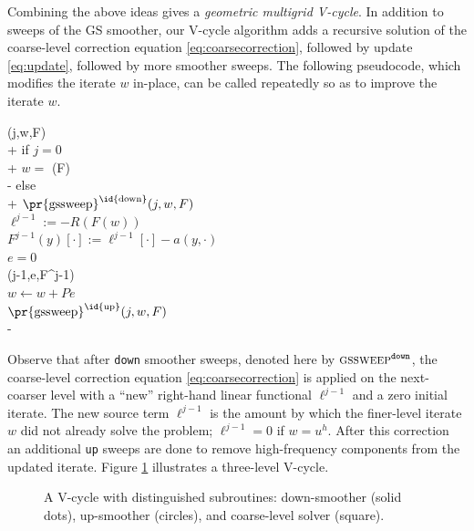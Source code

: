 \documentclass[letterpaper,final,12pt,reqno]{amsart}
\theoremstyle{claim}
\numberwithin{equation}{section}
\numberwithin{figure}{section}
\numberwithin{table}{section}
\begin{document}
Combining the above ideas gives a \emph{geometric multigrid V-cycle}.  In addition to sweeps of the GS smoother, our V-cycle algorithm adds a recursive solution of the coarse-level correction equation \eqref{eq:coarsecorrection}, followed by update \eqref{eq:update}, followed by more smoother sweeps.  The following pseudocode, which modifies the iterate $w$ in-place, can be called repeatedly so as to improve the iterate $w$.
\begin{pseudo*}
(j,w,F)\text{:} \\+
    if $j=0$ \\+
        $w =$ (F) \\-
    else \\+
        $\text{\pr{gssweep}}^{\text{\id{down}}}(j,w,F)$ \\
        $\ell^{j-1} := -R(F(w))$ \\
        $F^{j-1}(y)[\cdot] := \ell^{j-1}[\cdot] - a(y,\cdot)$ \\
        $e=0$ \\
        (j-1,e,F^{j-1}) \\
        $w \gets w + P e$ \\
        $\text{\pr{gssweep}}^{\text{\id{up}}}(j,w,F)$ \\-
\end{pseudo*}

Observe that after \texttt{down} smoother sweeps, denoted here by $\text{\textsc{gssweep}}^{\text{\texttt{down}}}$, the coarse-level correction equation \eqref{eq:coarsecorrection} is applied on the next-coarser level with a ``new'' right-hand linear functional $\ell^{j-1}$ and a zero initial iterate.  The new source term $\ell^{j-1}$ is the amount by which the finer-level iterate $w$ did not already solve the problem; $\ell^{j-1}=0$ if $w=u^h$.  After this correction an additional \texttt{up} sweeps are done to remove high-frequency components from the updated iterate.  Figure \ref{fig:vcycle} illustrates a three-level V-cycle.

\begin{figure}

\caption{A V-cycle with distinguished subroutines: down-smoother (solid dots), up-smoother (circles), and coarse-level solver (square).}
\label{fig:vcycle}
\end{figure}
\end{document}
